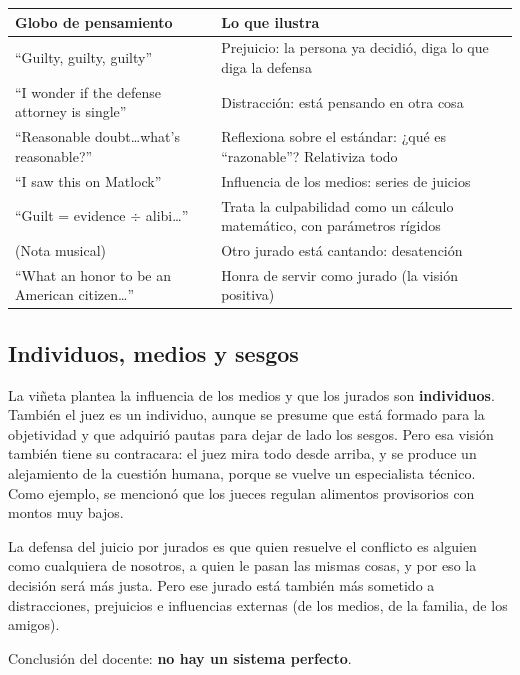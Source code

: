 \documentclass[12pt,oneside]{book}
\begin{document}
\begin{table}[H]
\centering
\small
\renewcommand{\arraystretch}{1.25}
\begin{tabularx}{\textwidth}{@{}>{\raggedright\arraybackslash}p{}Y@{}}
\toprule
\textbf{Globo de pensamiento} & \textbf{Lo que ilustra} \\
\midrule
``Guilty, guilty, guilty'' & Prejuicio: la persona ya decidió, diga lo que diga la defensa \\
``I wonder if the defense attorney is single'' & Distracción: está pensando en otra cosa \\
``Reasonable doubt\ldots what's reasonable?'' & Reflexiona sobre el estándar: ¿qué es ``razonable''? Relativiza todo \\
``I saw this on Matlock'' & Influencia de los medios: series de juicios \\
``Guilt = evidence $\div$ alibi\ldots'' & Trata la culpabilidad como un cálculo matemático, con parámetros rígidos \\
(Nota musical) & Otro jurado está cantando: desatención \\
``What an honor to be an American citizen\ldots'' & Honra de servir como jurado (la visión positiva) \\
\bottomrule
\end{tabularx}
\end{table}

\subsection{Individuos, medios y sesgos}

La viñeta plantea la influencia de los medios y que los jurados son \textbf{individuos}. También el juez es un individuo, aunque se presume que está formado para la objetividad y que adquirió pautas para dejar de lado los sesgos. Pero esa visión también tiene su contracara: el juez mira todo desde arriba, y se produce un alejamiento de la cuestión humana, porque se vuelve un especialista técnico. Como ejemplo, se mencionó que los jueces regulan alimentos provisorios con montos muy bajos.

La defensa del juicio por jurados es que quien resuelve el conflicto es alguien como cualquiera de nosotros, a quien le pasan las mismas cosas, y por eso la decisión será más justa. Pero ese jurado está también más sometido a distracciones, prejuicios e influencias externas (de los medios, de la familia, de los amigos).

\begin{important}
Conclusión del docente: \textbf{no hay un sistema perfecto}.
\end{important}
\end{document}
